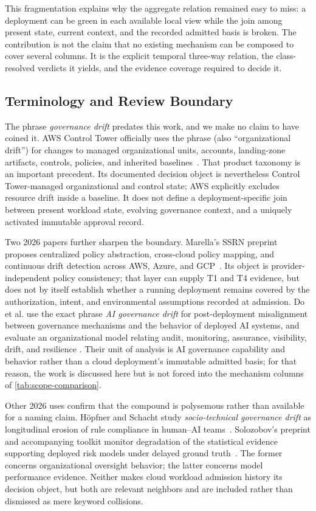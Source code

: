 This fragmentation explains why the aggregate relation remained easy to
miss: a deployment can be green in each available local view while the join
among present state, current context, and the recorded admitted basis is
broken. The contribution is not the claim that no existing mechanism can be
composed to cover several columns. It is the explicit temporal three-way
relation, the class-resolved verdicts it yields, and the evidence coverage
required to decide it.

\subsection{Terminology and Review Boundary}
The phrase \emph{governance drift} predates this work, and we make no claim to
have coined it. AWS Control Tower officially uses the phrase (also
``organizational drift'') for changes to managed organizational units,
accounts, landing-zone artifacts, controls, policies, and inherited
baselines~\cite{awsctgovernancedrift}. That product taxonomy is an important
precedent. Its documented decision object is nevertheless Control
Tower-managed organizational and control state; AWS explicitly excludes
resource drift inside a baseline. It does not define a deployment-specific
join between present workload state, evolving governance context, and a
uniquely activated immutable approval record.

Two 2026 papers further sharpen the boundary. Marella's SSRN preprint proposes
centralized policy abstraction, cross-cloud policy mapping, and continuous
drift detection across AWS, Azure, and GCP~\cite{marella2026multicloud}. Its
object is provider-independent policy consistency; that layer can supply T1
and T4 evidence, but does not by itself establish whether a running deployment
remains covered by the authorization, intent, and environmental assumptions
recorded at admission. Do et al. use the exact phrase \emph{AI governance
drift} for post-deployment misalignment between governance mechanisms and the
behavior of deployed AI systems, and evaluate an organizational model relating
audit, monitoring, assurance, visibility, drift, and resilience
\cite{do2026aigovernancedrift}. Their unit of analysis is AI governance
capability and behavior rather than a cloud deployment's immutable admitted
basis; for that reason, the work is discussed here but is not forced into the
mechanism columns of \cref{tab:scope-comparison}.

Other 2026 uses confirm that the compound is polysemous rather than available
for a naming claim. H\"opfner and Schacht study \emph{socio-technical
governance drift} as longitudinal erosion of rule compliance in human--AI
teams~\cite{hoepfner2026architecture}. Solozobov's preprint and accompanying
toolkit monitor degradation of the statistical evidence supporting deployed
risk models under delayed ground truth~\cite{solozobov2026labelfree}. The
former concerns organizational oversight behavior; the latter concerns model
performance evidence. Neither makes cloud workload admission history its
decision object, but both are relevant neighbors and are included rather than
dismissed as mere keyword collisions.

